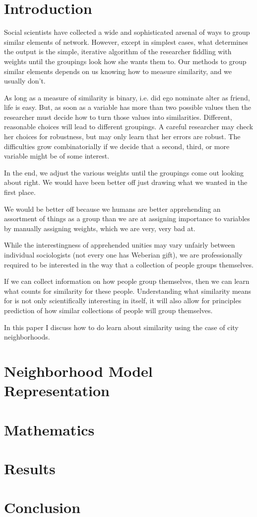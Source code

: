 \documentclass[12pt,draft,letter]{article}
\begin{document}
\section{Introduction}
Social scientists have collected a wide and sophisticated arsenal of
ways to group similar elements of network. However, except in simplest
cases, what determines the output is the simple, iterative algorithm
of the researcher fiddling with weights until the groupings look how
she wants them to. Our methods to group similar elements depends on us
knowing how to measure similarity, and we usually don't.

As long as a measure of similarity is binary, i.e. did ego nominate
alter as friend, life is easy. But, as soon as a variable has more
than two possible values then the researcher must decide how to turn
those values into similarities. Different, reasonable choices will
lead to different groupings. A careful researcher may check
her choices for robustness, but may only learn that her errors are
robust. The difficulties grow combinatorially if we decide that
a second, third, or more variable might be of some interest.

In the end, we adjust the various weights until the groupings come out
looking about right. We would have been better off just drawing what
we wanted in the first place.

We would be better off because we humans are better apprehending an
assortment of things as a group than we are at assigning importance to
variables by manually assigning weights, which we are very, very bad
at.

While the interestingness of apprehended unities may vary 
unfairly between individual sociologists (not every one has Weberian gift),
we are professionally required to be interested in the way that a
collection of people groups themselves.

If we can collect information on how people group themselves, then we
can learn what counts for similarity for these people. Understanding
what similarity means for is not only scientifically interesting in
itself, it will also allow for principles prediction of how similar
collections of people will group themselves.

In this paper I discuss how to do learn about similarity using the
case of city neighborhoods. 
\section{Neighborhood Model Representation}

\section{Mathematics}

\section{Results}

\section{Conclusion}
\end{document}

